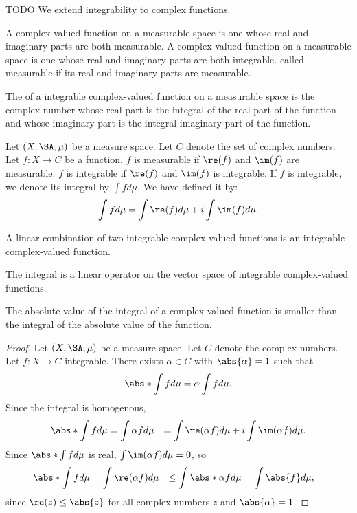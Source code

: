 

TODO
We extend integrability
to complex functions.


A 
complex-valued function
on a measurable space is
one whose real and imaginary
parts are both measurable.
A 
complex-valued function
on a measurable space is
one whose real and imaginary
parts are both integrable.
called measurable if
its real and imaginary
parts are measurable.

The 
of a integrable complex-valued
function on a measurable space
is the complex number whose
real part is the integral
of the real part of the function
and whose imaginary part is the
integral imaginary part of the
function.



Let $(X, \SA, \mu)$
be a measure space.
Let $C$ denote the set
of complex numbers.
Let $f: X \to C$
be a function.
$f$ is measurable
if $\re(f)$ and $\im(f)$
are measurable.
$f$ is integrable if
$\re(f)$ and $\im(f)$
is integrable.
If $f$ is integrable,
we denote its integral
by $\int f d\mu$.
We have defined it by:
\[
  \int f d\mu = \int \re(f)d\mu
  + i\int \im(f) d\mu.
\]


\begin{prop}
A linear combination
of two integrable complex-valued
functions is an integrable
complex-valued function.
\end{prop}

\begin{prop}
The integral is a linear
operator on the vector space
of integrable complex-valued
functions.
\end{prop}

\begin{prop}
The absolute value
of the integral of a
complex-valued function
is smaller than the integral
of the absolute value
of the function.

\begin{proof}
Let $(X, \SA, \mu)$
be a measure space.
Let $C$ denote the
complex numbers.
Let $f: X \to C$
integrable.
There exists $\alpha \in C$
with $\abs{\alpha} = 1$
such that
\[
  \abs*{\int f d\mu} = \alpha \int f d\mu.
\]
Since the integral is homogenous,
\[
  \begin{aligned}
  \abs*{\int f d\mu}
  &= \int \alpha f d\mu
  &= \int \re(\alpha f) d\mu + i \int \im(\alpha f)d\mu.
  \end{aligned}
\]
  Since $\abs*{\int f d\mu}$ is real,
  $\int \im(\alpha f) d\mu = 0$,
  so
  \[
  \begin{aligned}
  \abs*{\int f d\mu}
  &= \int \re(\alpha f) d\mu
  &\leq \int \abs*{\alpha f} d\mu
  &= \int \abs{f} d\mu,
  \end{aligned}
  \]
  since $\re(z) \leq \abs{z}$ for all
  complex numbers $z$ and $\abs{\alpha} = 1$.
\end{proof}
\end{prop}
